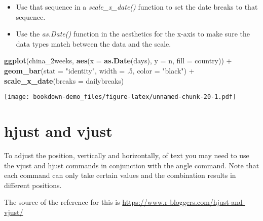 \documentclass[]{book}
\newenvironment{Shaded}{\begin{snugshade}}{\end{snugshade}}
\newcommand{\KeywordTok}[1]{\textcolor[rgb]{0.13,0.29,0.53}{\textbf{{#1}}}}
\newcommand{\DataTypeTok}[1]{\textcolor[rgb]{0.13,0.29,0.53}{{#1}}}
\newcommand{\DecValTok}[1]{\textcolor[rgb]{0.00,0.00,0.81}{{#1}}}
\newcommand{\StringTok}[1]{\textcolor[rgb]{0.31,0.60,0.02}{{#1}}}
\newcommand{\NormalTok}[1]{{#1}}
\theoremstyle{definition}
\theoremstyle{definition}
\theoremstyle{remark}
\begin{document}
\begin{Shaded}
\end{Shaded}

\begin{itemize}
\item
  Use that sequence in a \emph{scale\_x\_date()} function to set the
  date breaks to that sequence.
\item
  Use the \emph{as.Date()} function in the aesthetics for the x-axis to
  make sure the data types match between the data and the scale.
\end{itemize}

\begin{Shaded}
\begin{Highlighting}[]
\KeywordTok{ggplot}\NormalTok{(china_2weeks, }\KeywordTok{aes}\NormalTok{(}\DataTypeTok{x =} \KeywordTok{as.Date}\NormalTok{(days), }\DataTypeTok{y =} \NormalTok{n, }\DataTypeTok{fill =} \NormalTok{country)) +}
\StringTok{  }\KeywordTok{geom_bar}\NormalTok{(}\DataTypeTok{stat =} \StringTok{"identity"}\NormalTok{, }\DataTypeTok{width =} \NormalTok{.}\DecValTok{5}\NormalTok{, }\DataTypeTok{color =} \StringTok{"black"}\NormalTok{) +}
\StringTok{  }\KeywordTok{scale_x_date}\NormalTok{(}\DataTypeTok{breaks =} \NormalTok{dailybreaks)}
\end{Highlighting}
\end{Shaded}

\texttt{[image: bookdown-demo\_files/figure-latex/unnamed-chunk-20-1.pdf]}

\section{hjust and vjust}\label{hjust-and-vjust}

To adjust the position, vertically and horizontally, of text you may
need to use the vjust and hjust commands in conjunction with the angle
command. Note that each command can only take certain values and the
combination results in different positions.

The source of the reference for this is
\url{https://www.r-bloggers.com/hjust-and-vjust/}
\end{document}
